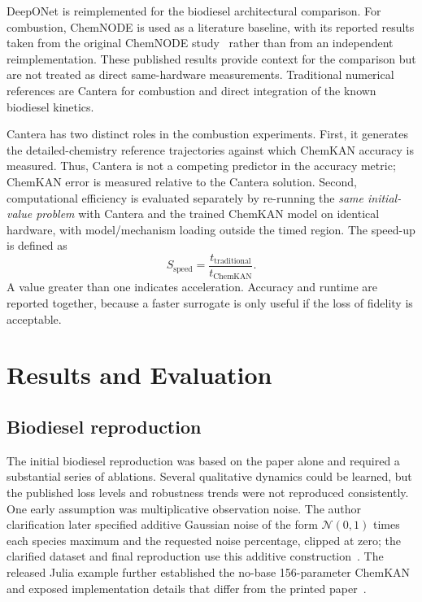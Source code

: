 \documentclass[11pt,a4paper]{article}
\begin{document}
DeepONet is reimplemented for the biodiesel
architectural comparison. For combustion,
ChemNODE is used as a literature baseline,
with its reported results taken from the
original ChemNODE study~\cite{OWOYELE2022100118}
rather than from an independent reimplementation.
These published results provide context for the
comparison but are not treated as direct
same-hardware measurements. Traditional numerical
references are Cantera for combustion and direct
integration of the known biodiesel kinetics.

Cantera has two distinct roles in the combustion experiments. First, it generates the detailed-chemistry reference trajectories against which ChemKAN accuracy is measured. Thus, Cantera is not a competing predictor in the accuracy metric; ChemKAN error is measured relative to the Cantera solution. Second, computational efficiency is evaluated separately by re-running the \emph{same initial-value problem} with Cantera and the trained ChemKAN model on identical hardware, with model/mechanism loading outside the timed region. The speed-up is defined as
\begin{equation}
    S_{\mathrm{speed}} = \frac{t_{\mathrm{traditional}}}{t_{\mathrm{ChemKAN}}}.
\end{equation}
A value greater than one indicates acceleration. Accuracy and runtime are reported together, because a faster surrogate is only useful if the loss of fidelity is acceptable.

\section{Results and Evaluation}

\subsection{Biodiesel reproduction}

The initial biodiesel reproduction was based on the paper alone and required a substantial series of ablations. Several qualitative dynamics could be learned, but the published loss levels and robustness trends were not reproduced consistently. One early assumption was multiplicative observation noise. The author clarification later specified additive Gaussian noise of the form $\mathcal{N}(0,1)$ times each species maximum and the requested noise percentage, clipped at zero; the clarified dataset and final reproduction use this additive construction~\cite{ChemKANAuthors2026}. The released Julia example further established the no-base 156-parameter ChemKAN and exposed implementation details that differ from the printed paper~\cite{ChemKANRepo2026}.
\end{document}
